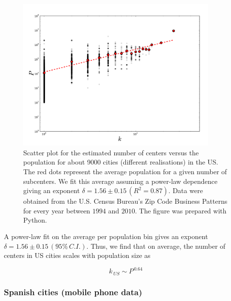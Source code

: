 \begin{figure}
    \centering
    \includegraphics[width=0.9\textwidth]{gfx/chapter-monocentric/us_num-centers.pdf}
    \caption{Scatter plot for the estimated number of centers versus the
    population for about 9000 cities (different realisations) in the US. The red
dots represent the average population for a given number of subcenters. We fit
this average assuming a power-law dependence giving an exponent $\delta = 1.56
    \pm 0.15\,(R^2=0.87)$. Data were obtained from the U.S. Census Bureau's Zip
Code Business Patterns for every year between $1994$ and $2010$. The figure was
prepared with Python.\label{fig:us_centers}}
\end{figure}


A power-law fit on the average per population bin gives an exponent $\delta =
1.56 \pm 0.15\,(95\%\,C.I.)$. Thus, we find that on average, the number of
centers in US cities scales with population size as

\begin{equation}
    k_{\,US} \sim P^{\,0.64}
\end{equation}

\subsubsection{Spanish cities (mobile phone data)}
\label{sub:spanish_cities_mobile_phone_data_}

